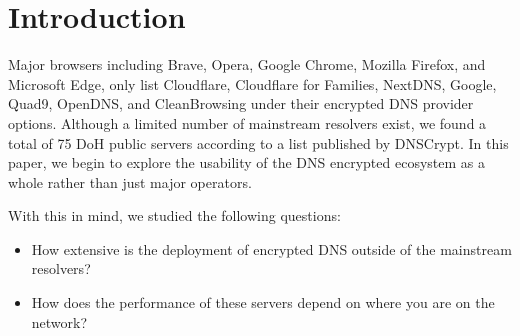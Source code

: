 \section{Introduction}\label{sec:intro}

Major browsers including Brave, Opera, Google Chrome, Mozilla Firefox, and Microsoft Edge, only list Cloudflare, Cloudflare for Families, NextDNS, Google, Quad9, OpenDNS, and CleanBrowsing under their encrypted DNS provider options.
Although a limited number of mainstream resolvers exist, we found a total of 75 DoH public servers according to a list published by DNSCrypt.
In this paper, we begin to explore the usability of the DNS encrypted ecosystem as a whole rather than just major operators. 

With this in mind, we studied the following questions:

\begin{itemize}
\setlength\itemsep{0em}
\item How extensive is the deployment of encrypted DNS outside of the mainstream resolvers?
\item How does the performance of these servers depend on where you are on the network?

\end{itemize}
